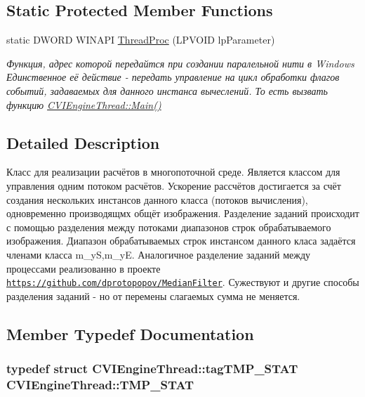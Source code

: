 \subsection*{Static Protected Member Functions}
\begin{DoxyCompactItemize}
\item 
static D\+W\+O\+R\+D W\+I\+N\+A\+P\+I \hyperlink{class_c_v_i_engine_thread_abf714adf1c42385f396ebe4ff48f181c}{Thread\+Proc} (L\+P\+V\+O\+I\+D lp\+Parameter)
\begin{DoxyCompactList}\small\item\em Функция, адрес которой передайтся при создании паралельной нити в Windows Единственное её действие -\/ передать управление на цикл обработки флагов событий, задаваемых для данного инстанса вычеслений. То есть вызвать функцию \hyperlink{class_c_v_i_engine_thread_a24ed1bd13eea28048ed010e65697e578}{C\+V\+I\+Engine\+Thread\+::\+Main()} \end{DoxyCompactList}\end{DoxyCompactItemize}


\subsection{Detailed Description}
Класс для реализации расчётов в многопоточной среде. Является классом для управления одним потоком расчётов. Ускорение рассчётов достигается за счёт создания нескольких инстансов данного класса (потоков вычисления), одновременно производящмх общёт изображения. Разделение заданий происходит с помощью разделения между потоками диапазонов строк обрабатываемого изображения. Диапазон обрабатываемых строк инстансом данного класа задаётся членами класса m\+\_\+y\+S,m\+\_\+y\+E. Аналогичное разделение заданий между процессами реализованно в проекте \href{https://github.com/dprotopopov/MedianFilter}{\tt https\+://github.\+com/dprotopopov/\+Median\+Filter}. Сужествуют и другие способы разделения заданий -\/ но от перемены слагаемых сумма не меняется. 



\subsection{Member Typedef Documentation}
\hypertarget{class_c_v_i_engine_thread_a963dcd94cfc9dd191a6c4dc50458797f}{
\subsubsection[{T\+M\+P\+\_\+\+S\+T\+A\+T}]{\setlength{\rightskip}{0pt plus 5cm}typedef struct {\bf C\+V\+I\+Engine\+Thread\+::tag\+T\+M\+P\+\_\+\+S\+T\+A\+T}  {\bf C\+V\+I\+Engine\+Thread\+::\+T\+M\+P\+\_\+\+S\+T\+A\+T}}}\label{class_c_v_i_engine_thread_a963dcd94cfc9dd191a6c4dc50458797f}


